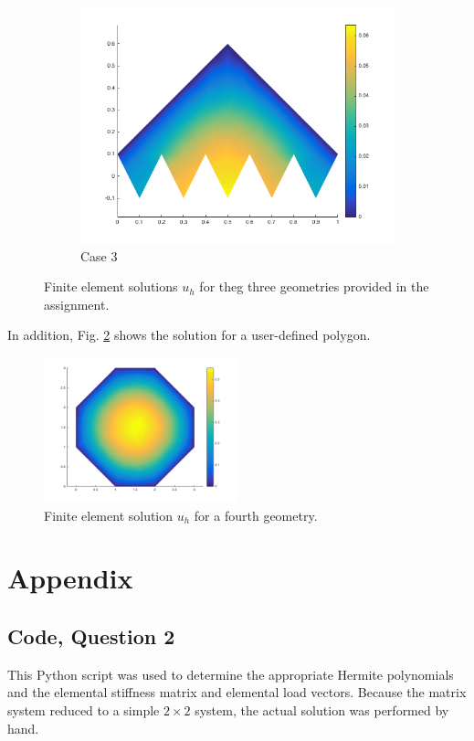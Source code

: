 \documentclass[10pt]{article}
\begin{document}
\begin{figure}[H]
\begin{subfigure}[b]{0.35\textwidth}
                \includegraphics[width=\textwidth]{case3.png}
                \caption{Case 3}
        \end{subfigure}%
        \caption{Finite element solutions \(u_h\) for theg three geometries provided in the assignment.}
        \label{fig:5}
\end{figure}

In addition, Fig. \ref{fig:10} shows the solution for a user-defined polygon. 

\begin{figure}[H]
\centering
\includegraphics[width=0.5\textwidth]{case4.png}
\caption{Finite element solution \(u_h\) for a fourth geometry.}
\label{fig:10}
\end{figure}

\section{Appendix}

\subsection{Code, Question 2}

This Python script was used to determine the appropriate Hermite polynomials and the elemental stiffness matrix and elemental load vectors. Because the matrix system reduced to a simple \(2\times 2\) system, the actual solution was performed by hand.


\end{document}
